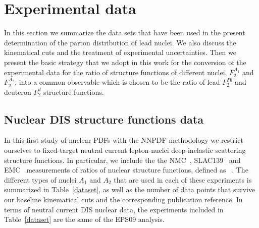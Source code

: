 
\section{Experimental data}
\label{sec:expdata}

In this section we summarize the data sets that have been used
in the present determination of the parton distribution of lead nuclei.
%
We also discuss the kinematical cuts and the  treatment of experimental
uncertainties.
%
Then we present the basic strategy that we adopt in this work
for the conversion of the
experimental data for the ratio of structure functions of different nuclei, $F_2^{A_1}$ and $F_2^{A_2}$, into
a common observable which is chosen to be the ratio of lead $F_2^{Pb}$ and deuteron $F_2^d$ structure
functions.


\subsection{Nuclear DIS structure functions data}


%
In this first study of nuclear PDFs with the NNPDF methodology
we restrict ourselves to fixed-target neutral current lepton-nuclei
deep-inelastic scattering structure functions.
%
In particular, we include the the
NMC~\cite{Amaudruz:1995tq,Arneodo:1995cs,Arneodo:1996rv,Arneodo:1996ru}, SLAC139~\cite{PhysRevD.49.4348} and EMC~\cite{Ashman:1992kv}
measurements of ratios of nuclear structure functions, defined
as
\be
\label{eqratio}
 \, .
\ee
The different types of nuclei $A_1$ and $A_2$ that are used in each
of these experiments is summarized in  Table~\ref{dataset}, as well
as the number of data points that survive our baseline kinematical
cuts and the corresponding publication reference.
%
In terms of neutral current DIS nuclear data, the experiments included
in Table~\ref{dataset} are the same of the EPS09 analysis.


